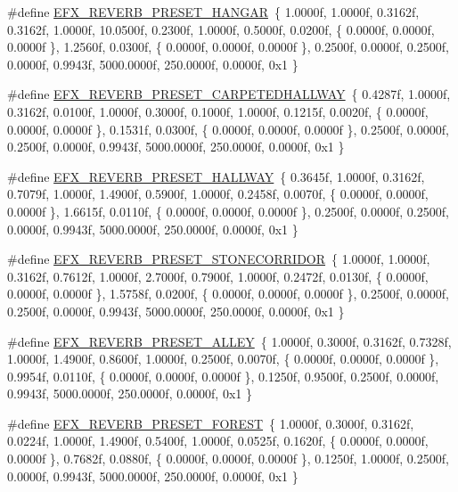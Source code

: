 \begin{DoxyCompactItemize}
\#define \hyperlink{efx-presets_8h_a191cdef4e04feae0911f89da86fa1afe}{E\+F\+X\+\_\+\+R\+E\+V\+E\+R\+B\+\_\+\+P\+R\+E\+S\+E\+T\+\_\+\+H\+A\+N\+G\+AR}~\{ 1.\+0000f, 1.\+0000f, 0.\+3162f, 0.\+3162f, 1.\+0000f, 10.\+0500f, 0.\+2300f, 1.\+0000f, 0.\+5000f, 0.\+0200f, \{ 0.\+0000f, 0.\+0000f, 0.\+0000f \}, 1.\+2560f, 0.\+0300f, \{ 0.\+0000f, 0.\+0000f, 0.\+0000f \}, 0.\+2500f, 0.\+0000f, 0.\+2500f, 0.\+0000f, 0.\+9943f, 5000.\+0000f, 250.\+0000f, 0.\+0000f, 0x1 \}
\item 
\#define \hyperlink{efx-presets_8h_a178ed1682d59effcaa37ee1bb6ee69c1}{E\+F\+X\+\_\+\+R\+E\+V\+E\+R\+B\+\_\+\+P\+R\+E\+S\+E\+T\+\_\+\+C\+A\+R\+P\+E\+T\+E\+D\+H\+A\+L\+L\+W\+AY}~\{ 0.\+4287f, 1.\+0000f, 0.\+3162f, 0.\+0100f, 1.\+0000f, 0.\+3000f, 0.\+1000f, 1.\+0000f, 0.\+1215f, 0.\+0020f, \{ 0.\+0000f, 0.\+0000f, 0.\+0000f \}, 0.\+1531f, 0.\+0300f, \{ 0.\+0000f, 0.\+0000f, 0.\+0000f \}, 0.\+2500f, 0.\+0000f, 0.\+2500f, 0.\+0000f, 0.\+9943f, 5000.\+0000f, 250.\+0000f, 0.\+0000f, 0x1 \}
\item 
\#define \hyperlink{efx-presets_8h_a5e2ae3a6889f4c3cce4a7fbffa6f5959}{E\+F\+X\+\_\+\+R\+E\+V\+E\+R\+B\+\_\+\+P\+R\+E\+S\+E\+T\+\_\+\+H\+A\+L\+L\+W\+AY}~\{ 0.\+3645f, 1.\+0000f, 0.\+3162f, 0.\+7079f, 1.\+0000f, 1.\+4900f, 0.\+5900f, 1.\+0000f, 0.\+2458f, 0.\+0070f, \{ 0.\+0000f, 0.\+0000f, 0.\+0000f \}, 1.\+6615f, 0.\+0110f, \{ 0.\+0000f, 0.\+0000f, 0.\+0000f \}, 0.\+2500f, 0.\+0000f, 0.\+2500f, 0.\+0000f, 0.\+9943f, 5000.\+0000f, 250.\+0000f, 0.\+0000f, 0x1 \}
\item 
\#define \hyperlink{efx-presets_8h_a8224ffb5a04a2c06c7e2d9fe2b38a06c}{E\+F\+X\+\_\+\+R\+E\+V\+E\+R\+B\+\_\+\+P\+R\+E\+S\+E\+T\+\_\+\+S\+T\+O\+N\+E\+C\+O\+R\+R\+I\+D\+OR}~\{ 1.\+0000f, 1.\+0000f, 0.\+3162f, 0.\+7612f, 1.\+0000f, 2.\+7000f, 0.\+7900f, 1.\+0000f, 0.\+2472f, 0.\+0130f, \{ 0.\+0000f, 0.\+0000f, 0.\+0000f \}, 1.\+5758f, 0.\+0200f, \{ 0.\+0000f, 0.\+0000f, 0.\+0000f \}, 0.\+2500f, 0.\+0000f, 0.\+2500f, 0.\+0000f, 0.\+9943f, 5000.\+0000f, 250.\+0000f, 0.\+0000f, 0x1 \}
\item 
\#define \hyperlink{efx-presets_8h_a9d007a740c938eb36c9bc66020999706}{E\+F\+X\+\_\+\+R\+E\+V\+E\+R\+B\+\_\+\+P\+R\+E\+S\+E\+T\+\_\+\+A\+L\+L\+EY}~\{ 1.\+0000f, 0.\+3000f, 0.\+3162f, 0.\+7328f, 1.\+0000f, 1.\+4900f, 0.\+8600f, 1.\+0000f, 0.\+2500f, 0.\+0070f, \{ 0.\+0000f, 0.\+0000f, 0.\+0000f \}, 0.\+9954f, 0.\+0110f, \{ 0.\+0000f, 0.\+0000f, 0.\+0000f \}, 0.\+1250f, 0.\+9500f, 0.\+2500f, 0.\+0000f, 0.\+9943f, 5000.\+0000f, 250.\+0000f, 0.\+0000f, 0x1 \}
\item 
\#define \hyperlink{efx-presets_8h_a94d24ea2fae4d12deed381cc84f67449}{E\+F\+X\+\_\+\+R\+E\+V\+E\+R\+B\+\_\+\+P\+R\+E\+S\+E\+T\+\_\+\+F\+O\+R\+E\+ST}~\{ 1.\+0000f, 0.\+3000f, 0.\+3162f, 0.\+0224f, 1.\+0000f, 1.\+4900f, 0.\+5400f, 1.\+0000f, 0.\+0525f, 0.\+1620f, \{ 0.\+0000f, 0.\+0000f, 0.\+0000f \}, 0.\+7682f, 0.\+0880f, \{ 0.\+0000f, 0.\+0000f, 0.\+0000f \}, 0.\+1250f, 1.\+0000f, 0.\+2500f, 0.\+0000f, 0.\+9943f, 5000.\+0000f, 250.\+0000f, 0.\+0000f, 0x1 \}

\end{DoxyCompactItemize}
